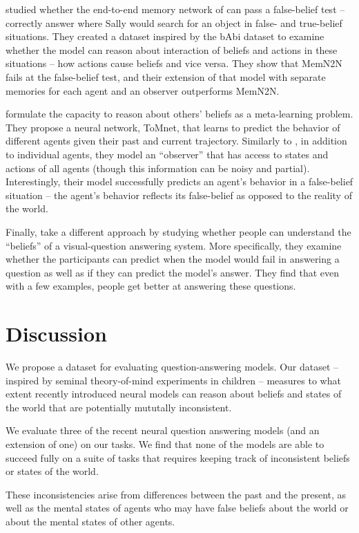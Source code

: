 \citet{grant.etal.2017} studied whether the end-to-end memory network of
\citet{sukhbaatar2015end} can pass a false-belief test -- correctly answer where Sally would search for an object in false- and true-belief situations. They created a dataset inspired by the bAbi dataset to examine whether the model can reason about interaction of beliefs and actions in these situations -- how actions cause beliefs and vice versa.  They show that MemN2N fails at the false-belief test, and their extension of that model with separate memories for each agent and an observer outperforms MemN2N.

\citet{rabinowitz.etal.2018} formulate the capacity to reason about others' beliefs as a meta-learning problem. They propose a neural network, ToMnet, that learns to predict the behavior of different agents given their past and current trajectory. Similarly to \citet{grant.etal.2017}, in addition to individual agents, they model an ``observer'' that has access to states and actions of all agents (though this information can be noisy and partial). Interestingly, their model successfully predicts an agent's behavior in a false-belief situation -- the agent's behavior reflects its false-belief as opposed to the reality of the world.

Finally, \citet{chandrasekaran2017takes} take a different approach by studying whether people can understand the ``beliefs'' of a visual-question answering system. More specifically, they examine whether the participants can predict when the model would fail in answering a question as well as if they can predict the model's answer. They find that even with a few examples, people get better at answering these questions.

\section{Discussion}
We propose a dataset for evaluating question-answering models. Our dataset -- inspired by seminal theory-of-mind experiments in children -- measures to what extent recently introduced neural models can reason about beliefs and states of the world that are potentially mututally inconsistent.

We evaluate three of the recent neural question answering models (and an extension of one) on our tasks. We find that none of the models are able to succeed fully on a suite of tasks that requires keeping track of inconsistent beliefs or states of the world.

These inconsistencies arise from differences between the past and the present, as well as the mental states of agents who may have false beliefs about the world or about the mental states of other agents.


